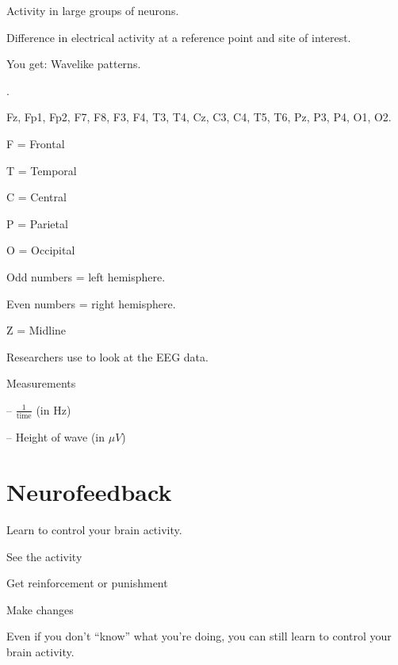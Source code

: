 \begin{coloredlist}
    \item Activity in large groups of neurons.
    \item Difference in electrical activity at a reference point and site of interest.
    \item You get: Wavelike patterns.
    \item {}.
    \begin{coloredlist}
        \item Fz, Fp1, Fp2, F7, F8, F3, F4, T3, T4, Cz, C3, C4, T5, T6, Pz, P3, P4, O1, O2.
        \begin{multicols}{2}
            \begin{coloredlist}
                \item F = Frontal
                \item T = Temporal
                \item C = Central
                \item P = Parietal
                \item O = Occipital
                \item Odd numbers = left hemisphere.
                \item Even numbers = right hemisphere.
                \item Z = Midline
            \end{coloredlist}
        \end{multicols}
    \end{coloredlist}
    \item Researchers use  to look at the EEG data.
    \item Measurements
    \begin{coloredlist}
        \item {} -- \(\frac{1}{\text{time}}\) (in Hz)
        \item {} -- Height of wave (in \(\mu V\))
    \end{coloredlist}
\end{coloredlist}

\section{Neurofeedback}

\begin{coloredlist}
    \item Learn to control your brain activity.
    \begin{coloredlist}
        \item See the activity
        \item Get reinforcement or punishment
        \item Make changes
        \item Even if you don't ``know'' what you're doing, you can still learn to control your brain activity.
    \end{coloredlist}
\end{coloredlist}

